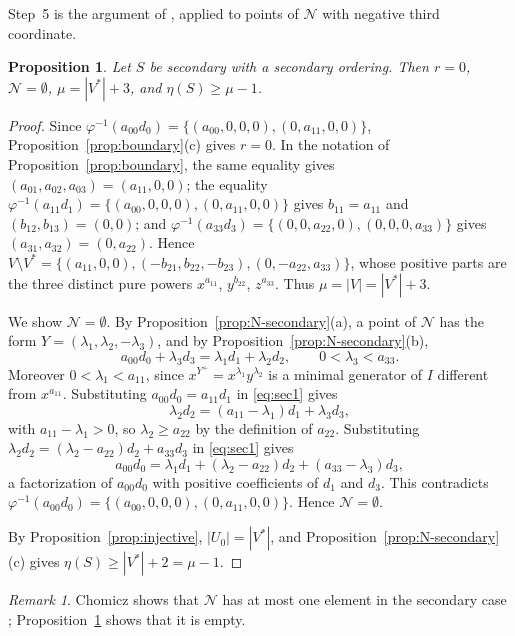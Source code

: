 \documentclass{amsart}
\newtheorem{proposition}[theorem]{Proposition}
\theoremstyle{definition}
\theoremstyle{remark}
\newtheorem{remark}[theorem]{Remark}
\numberwithin{equation}{section}
\begin{document}
Step~5 is the argument of \cite[Lemma~4.11]{Cho26}, applied to points of $\mathcal N$ with negative third coordinate.

\begin{proposition}\label{prop:secondary}
Let $S$ be secondary with a secondary ordering. Then $r=0$, $\mathcal N=\emptyset$, $\mu=|V^*|+3$, and $\eta(S)\ge\mu-1$.
\end{proposition}

\begin{proof}
Since $\varphi^{-1}(a_{00}d_0)=\{(a_{00},0,0,0),(0,a_{11},0,0)\}$, Proposition~\ref{prop:boundary}(c) gives $r=0$. In the notation of Proposition~\ref{prop:boundary}, the same equality gives $(a_{01},a_{02},a_{03})=(a_{11},0,0)$; the equality $\varphi^{-1}(a_{11}d_1)=\{(a_{00},0,0,0),(0,a_{11},0,0)\}$ gives $b_{11}=a_{11}$ and $(b_{12},b_{13})=(0,0)$; and $\varphi^{-1}(a_{33}d_3)=\{(0,0,a_{22},0),(0,0,0,a_{33})\}$ gives $(a_{31},a_{32})=(0,a_{22})$. Hence $V\setminus V^*=\{(a_{11},0,0),(-b_{21},b_{22},-b_{23}),(0,-a_{22},a_{33})\}$, whose positive parts are the three distinct pure powers $x^{a_{11}}$, $y^{b_{22}}$, $z^{a_{33}}$. Thus $\mu=|V|=|V^*|+3$.

We show $\mathcal N=\emptyset$. By Proposition~\ref{prop:N-secondary}(a), a point of $\mathcal N$ has the form $Y=(\lambda_1,\lambda_2,-\lambda_3)$, and by Proposition~\ref{prop:N-secondary}(b),
\begin{equation}\label{eq:sec1}
a_{00}d_0+\lambda_3d_3=\lambda_1d_1+\lambda_2d_2,\qquad 0<\lambda_3<a_{33}.
\end{equation}
Moreover $0<\lambda_1<a_{11}$, since $x^{Y^+}=x^{\lambda_1}y^{\lambda_2}$ is a minimal generator of $I$ different from $x^{a_{11}}$. Substituting $a_{00}d_0=a_{11}d_1$ in \eqref{eq:sec1} gives
\[
\lambda_2d_2=(a_{11}-\lambda_1)d_1+\lambda_3d_3,
\]
with $a_{11}-\lambda_1>0$, so $\lambda_2\ge a_{22}$ by the definition of $a_{22}$. Substituting $\lambda_2d_2=(\lambda_2-a_{22})d_2+a_{33}d_3$ in \eqref{eq:sec1} gives
\[
a_{00}d_0=\lambda_1d_1+(\lambda_2-a_{22})d_2+(a_{33}-\lambda_3)d_3 ,
\]
a factorization of $a_{00}d_0$ with positive coefficients of $d_1$ and $d_3$. This contradicts $\varphi^{-1}(a_{00}d_0)=\{(a_{00},0,0,0),(0,a_{11},0,0)\}$. Hence $\mathcal N=\emptyset$.

By Proposition~\ref{prop:injective}, $|U_0|=|V^*|$, and Proposition~\ref{prop:N-secondary}(c) gives $\eta(S)\ge|V^*|+2=\mu-1$.
\end{proof}

\begin{remark}
Chomicz shows that $\mathcal N$ has at most one element in the secondary case \cite[Lemma~4.12]{Cho26}; Proposition~\ref{prop:secondary} shows that it is empty.
\end{remark}
\end{document}
